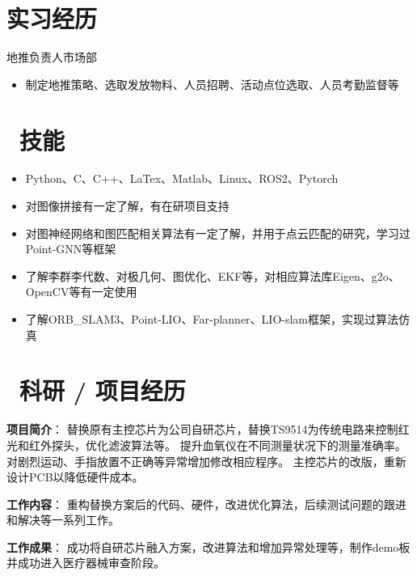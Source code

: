 \documentclass{resume}
\begin{document}
\section{\textcolor[RGB]{50,50,190}{\faAlignLeft 实习经历}}

地推负责人\qquad \qquad \quad 市场部
\begin{itemize}
  \item 制定地推策略、选取发放物料、人员招聘、活动点位选取、人员考勤监督等
\end{itemize}

\section{\textcolor[RGB]{50,50,190}{\faCogs\ 技能}}
\begin{itemize}[parsep=0.5ex]
  \item Python、C、C++、LaTex、Matlab、Linux、ROS2、Pytorch
  \item 对图像拼接有一定了解，有在研项目支持
  \item 对图神经网络和图匹配相关算法有一定了解，并用于点云匹配的研究，学习过Point-GNN等框架
  \item 了解李群李代数、对极几何、图优化、EKF等，对相应算法库Eigen、g2o、OpenCV等有一定使用
  \item 了解ORB\_SLAM3、Point-LIO、Far-planner、LIO-slam框架，实现过算法仿真
\end{itemize}


\section{\textcolor[RGB]{50,50,190}{\faUsers\ 科研 / 项目经历}}

\textcolor[RGB]{80,100,190}{\textbf{项目简介}}：
替换原有主控芯片为公司自研芯片，替换TS9514为传统电路来控制红光和红外探头，优化滤波算法等。
提升血氧仪在不同测量状况下的测量准确率。对剧烈运动、手指放置不正确等异常增加修改相应程序。
主控芯片的改版，重新设计PCB以降低硬件成本。

\textcolor[RGB]{80,100,190}{\textbf{工作内容}}：
重构替换方案后的代码、硬件，改进优化算法，后续测试问题的跟进和解决等一系列工作。

\textcolor[RGB]{80,100,190}{\textbf{工作成果}}：
成功将自研芯片融入方案，改进算法和增加异常处理等，制作demo板并成功进入医疗器械审查阶段。
\end{document}
